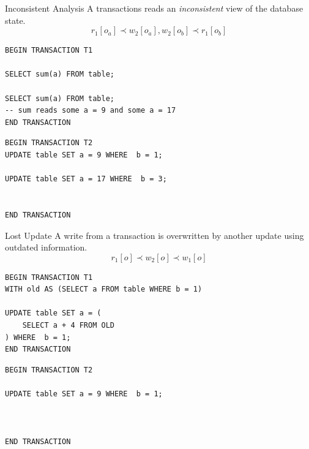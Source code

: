 \begin{definitionbox}{Inconsistent Analysis}
    A transactions reads an \textit{inconsistent} view of the database state.
    \[r_1[o_a] \prec w_2[o_a] ,  w_2[o_b] \prec r_1[o_b]\]
    \unfinished
    \tcblower
    \begin{minipage}[t]{.49\textwidth}
        \begin{verbatim}
BEGIN TRANSACTION T1

SELECT sum(a) FROM table;

SELECT sum(a) FROM table;
-- sum reads some a = 9 and some a = 17
END TRANSACTION
       \end{verbatim}
    \end{minipage} \hfill \begin{minipage}[t]{.49\textwidth}
        \begin{verbatim}
BEGIN TRANSACTION T2
UPDATE table SET a = 9 WHERE  b = 1;

UPDATE table SET a = 17 WHERE  b = 3;


END TRANSACTION
       \end{verbatim}
    \end{minipage}
\end{definitionbox}

\begin{definitionbox}{Lost Update}
    A write from a transaction is overwritten by another update using outdated information.
    \[r_1[o] \prec w_2[o] \prec w_1[o]\]
    \tcblower
    \begin{minipage}[t]{.49\textwidth}
        \begin{verbatim}
BEGIN TRANSACTION T1
WITH old AS (SELECT a FROM table WHERE b = 1)

UPDATE table SET a = (
    SELECT a + 4 FROM OLD
) WHERE  b = 1;
END TRANSACTION
        \end{verbatim}
    \end{minipage} \hfill \begin{minipage}[t]{.49\textwidth}
        \begin{verbatim}
BEGIN TRANSACTION T2

UPDATE table SET a = 9 WHERE  b = 1;



END TRANSACTION
        \end{verbatim}
    \end{minipage}
\end{definitionbox}

\newcommand{\prevented}{\textcolor{red}{Prevented}}
\newcommand{\allowed}{\textcolor{ForestGreen}{Allowed}}
